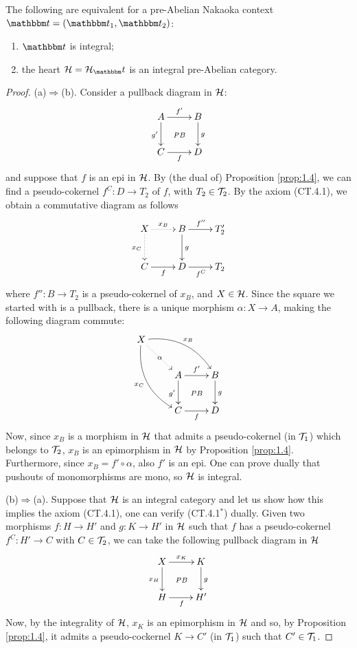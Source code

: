 \begin{thm}\label{5:thm:integral}
The following are equivalent for a pre-Abelian Nakaoka context $\t=(\t_1,\t_2)$:
\begin{enumerate}[label=(\alph*)]
\item $\t$ is integral;
\item the heart $\clH=\clH_\t$ is an integral pre-Abelian category.
\end{enumerate}
\end{thm}
\begin{proof}
(a)$\Rightarrow$(b). Consider a pullback diagram in $\mathcal{H}$:
\[
\xymatrix{
A\ar@{}[dr]|{PB}\ar[r]^{f'}\ar[d]_{g'}&B\ar[d]^g\\
C\ar[r]_{f}&D
}
\]
and suppose that $f$ is an epi in $\mathcal{H}$. By (the dual of) Proposition \ref{prop:1.4}, we can find a pseudo-cokernel $f^C\colon D\to T_2$ of $f$, with $T_2\in \mathcal{T}_2$. By the axiom (CT.4.1), we obtain a commutative diagram as follows
\[
\xymatrix{
X\ar@{.>}[d]_{x_C}\ar@{.>}[r]^{x_B}&B\ar[r]^{f''}\ar[d]^{g}&T'_2\\
C\ar[r]_f&D\ar[r]_{f^C}&T_2
}
\]
where $f''\colon B\to T_2$ is a pseudo-cokernel of $x_B$, and $X\in \mathcal{H}$. Since the square we started with is a pullback, there is a unique morphism $\alpha\colon X\to A$, making the following diagram commute:
\[
\xymatrix{
X\ar@/_15pt/[ddr]_{x_C}\ar@/_-15pt/[rrd]^{x_B}\ar@{.>}[dr]|\alpha\\
&A\ar@{}[dr]|{PB}\ar[r]^{f'}\ar[d]_{g'}&B\ar[d]^g\\
&C\ar[r]_{f}&D
}
\]
Now, since $x_B$ is a morphism in $\mathcal{H}$ that admits a pseudo-cokernel (in $\mathcal{T}_1$) which belongs to $\mathcal{T}_2$, $x_B$ is an epimorphism in $\mathcal{H}$ by Proposition \ref{prop:1.4}. Furthermore, since $x_B=f'\circ\alpha$, also $f'$ is an epi. One can prove dually that pushouts of monomorphisms are mono, so $\mathcal{H}$ is integral.

\smallskip\noindent
(b)$\Rightarrow$(a). Suppose that $\mathcal{H}$ is an integral category and let us show how this implies the axiom (CT.4.1), one can verify (CT.4.1$^*$) dually. Given two morphisms $f\colon H\to H'$ and $g\colon K\to H'$ in $\mathcal{H}$ such that $f$ has a pseudo-cokernel $f^C\colon H'\to C$ with $C\in \mathcal{T}_2$, we can take the following pullback diagram in $\mathcal{H}$
\[
\xymatrix{
X\ar[d]_{x_H}\ar[r]^{x_K}\ar@{}[dr]|{PB}&K\ar[d]^{g}\\
H\ar[r]_f&H'
}
\]
Now, by the integrality of $\mathcal{H}$, $x_K$ is an epimorphism in $\mathcal{H}$ and so, by Proposition \ref{prop:1.4}, it admits a pseudo-cockernel $K\to C'$ (in $\mathcal{T}_1$) such that $C'\in \mathcal{T}_1$.
\end{proof}

